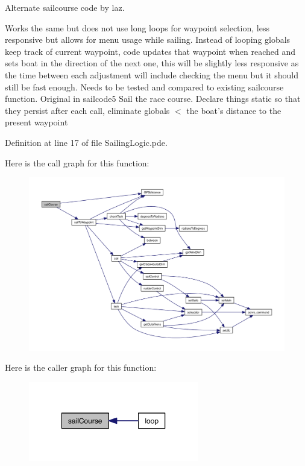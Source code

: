 \-Alternate sailcourse code by laz. 

\-Works the same but does not use long loops for waypoint selection, less responsive but allows for menu usage while sailing. \-Instead of looping globals keep track of current waypoint, code updates that waypoint when reached and sets boat in the direction of the next one, this will be slightly less responsive as the time between each adjustment will include checking the menu but it should still be fast enough. \-Needs to be tested and compared to existing sailcourse function. \-Original in sailcode5 \-Sail the race course. \-Declare things static so that they persist after each call, eliminate globals $<$ the boat's distance to the present waypoint 

\-Definition at line 17 of file \-Sailing\-Logic.\-pde.



\-Here is the call graph for this function\-:\nopagebreak
\begin{figure}[H]
\begin{center}
\leavevmode
\includegraphics[width=350pt]{_sailing_logic_8pde_aeaba10e3002bd9b9fd2ea1bdd5ab97ea_cgraph}
\end{center}
\end{figure}




\-Here is the caller graph for this function\-:\nopagebreak
\begin{figure}[H]
\begin{center}
\leavevmode
\includegraphics[width=210pt]{_sailing_logic_8pde_aeaba10e3002bd9b9fd2ea1bdd5ab97ea_icgraph}
\end{center}
\end{figure}


